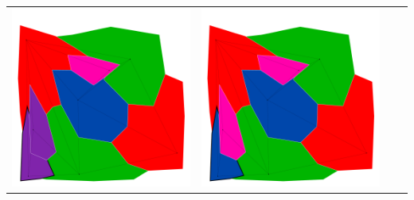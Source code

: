 \documentclass[10pt,a4paper]{article}
\begin{document}
\begin{tabular}{c c c c }
	\includegraphics[scale=.10]{../results/backtracking_mac/map_build/bt_mac_I00011.pdf}&
	\includegraphics[scale=.10]{../results/backtracking_mac/map_build/bt_mac_I00012.pdf}\\
	

\end{tabular}
\end{document}
